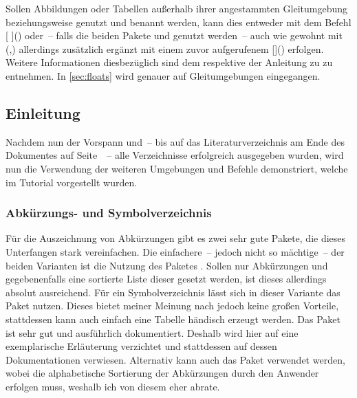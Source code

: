 \documentclass[%
  english,ngerman,%
  cdgeometry=no,DIV=12,automark%
]{tudscrartcl}
\begin{document}
Sollen Abbildungen oder Tabellen außerhalb ihrer angestammten Gleitumgebung 
 beziehungsweise  genutzt und benannt 
werden, kann dies entweder mit dem Befehl 
[%
]() oder~-- falls die beiden Pakete  und 
 genutzt werden~-- auch wie gewohnt mit 
(,) allerdings zusätzlich 
ergänzt mit einem zuvor aufgerufenem
[]()  
erfolgen. Weitere Informationen diesbezüglich sind dem \scrguide respektive der 
Anleitung zu  zu entnehmen. In \autoref{sec:floats} wird 
genauer auf Gleitumgebungen eingegangen.
%
\begin{Trunk}
\tableofcontents
\listoffigures
\listoftables

\end{Trunk}
\begin{Trunk+}
\printacronyms[style=acrotabu]
\printsymbols[style=symblongtabu]

\chapter{Einleitung}
Nachdem nun der Vorspann und~-- bis auf das Literaturverzeichnis am 
Ende des Dokumentes auf Seite~\pageref{sec:bibliography}~-- alle 
Verzeichnisse erfolgreich ausgegeben wurden, wird nun die Verwendung 
der weiteren Umgebungen und Befehle demonstriert, welche im Tutorial 
 vorgestellt wurden.

\end{Trunk+}


\subsection{Abkürzungs- und Symbolverzeichnis}
\label{sec:glossaries}%
%
Für die Auszeichnung von Abkürzungen gibt es zwei sehr gute Pakete, die dieses 
Unterfangen stark vereinfachen. Die einfachere~-- jedoch nicht so mächtige~-- 
der beiden Varianten ist die Nutzung des Paketes . Sollen nur 
Abkürzungen und gegebenenfalls eine sortierte Liste dieser gesetzt werden, ist 
dieses allerdings absolut ausreichend. Für ein Symbolverzeichnis lässt sich in 
dieser Variante das Paket  nutzen. Dieses bietet meiner 
Meinung nach jedoch keine großen Vorteile, stattdessen kann auch einfach eine 
Tabelle händisch erzeugt werden. Das Paket  ist sehr gut und 
ausführlich dokumentiert. Deshalb wird hier auf eine exemplarische Erläuterung 
verzichtet und stattdessen auf dessen Dokumentationen verwiesen. Alternativ 
kann auch das Paket  verwendet werden, wobei die alphabetische 
Sortierung der Abkürzungen durch den Anwender erfolgen muss, weshalb ich von 
diesem eher abrate.
\end{document}
